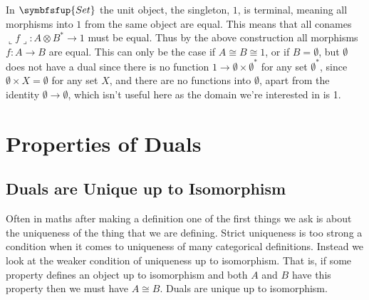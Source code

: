 \documentclass[fleqn]{NotesClass}
\makeatletter
\newcommand{\c@egory}[1]{\symbfsfup{#1}}
\newcommand{\Set}{\c@egory{Set}}
\newcommand{\isomorphic}{\cong}
\newcommand{\coname}[1]{\llcorner #1 \lrcorner}
\makeatother
\begin{document}
    In \(\Set\) the unit object, the singleton, \(1\), is terminal, meaning all morphisms into \(1\) from the same object are equal.
    This means that all conames \(\coname{f} \colon A \otimes B^* \to 1\) must be equal.
    Thus by the above construction all morphisms \(f \colon A \to B\) are equal.
    This can only be the case if \(A \isomorphic B \isomorphic 1\), or if \(B = \emptyset\), but \(\emptyset\) does not have a dual since there is no function \(1 \to \emptyset \times \emptyset^*\) for any set \(\emptyset^*\), since \(\emptyset \times X = \emptyset\) for any set \(X\), and there are no functions into \(\emptyset\), apart from the identity \(\emptyset \to \emptyset\), which isn't useful here as the domain we're interested in is 1.
    
    \chapter{Properties of Duals} 
    \section{Duals are Unique up to Isomorphism}
    Often in maths after making a definition one of the first things we ask is about the uniqueness of the thing that we are defining.
    Strict uniqueness is too strong a condition when it comes to uniqueness of many categorical definitions.
    Instead we look at the weaker condition of uniqueness up to isomorphism.
    That is, if some property defines an object up to isomorphism and both \(A\) and \(B\) have this property then we must have \(A \isomorphic B\).
    Duals are unique up to isomorphism.
    
\end{document}
